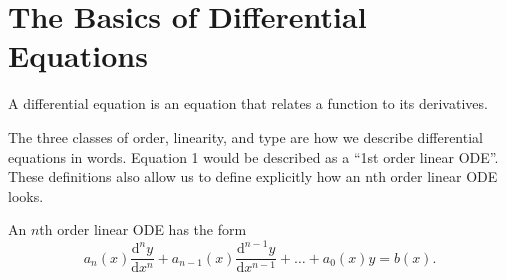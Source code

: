 \chapter{The Basics of Differential Equations}
\noindent
A differential equation is an equation that relates a function to its derivatives.



\noindent
The three classes of order, linearity, and type are how we describe differential equations in words. Equation 1 would be described as a ``1st order linear ODE''. These definitions also allow us to define explicitly how an nth order linear ODE looks.


\begin{definition}
	An $n$th order linear ODE has the form
	\begin{equation*}
	a_n(x)\frac{\mathrm{d}^n y}{\mathrm{d} x^n} + a_{n-1}(x)\frac{\mathrm{d}^{n-1} y}{\mathrm{d} x^{n-1}} + \ldots + a_0(x)y = b(x).
	\end{equation*}
\end{definition}



